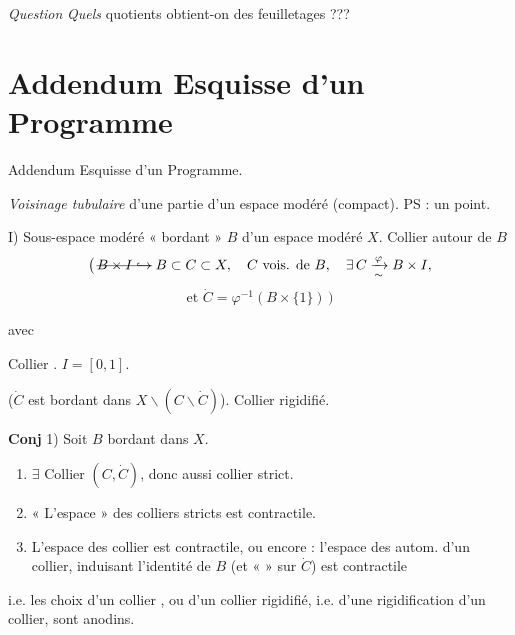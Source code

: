 \documentclass[11pt,a4paper]{article}
\begin{document}
\emph{Question} \emph{Quels} quotients obtient-on  des feuilletages ???



\section{Addendum Esquisse d'un Programme}


Addendum Esquisse d'un Programme.

\emph{Voisinage tubulaire} d'une partie   d'un espace modéré (compact). PS  : un point.

I) Sous-espace modéré « bordant » \struck{\ill{}} $B$ d'un espace modéré $X$. Collier autour de $B$
\[
  \bigl(\, \text{\struck{$B \times I \hookrightarrow$}}\; B \subset C \subset X,
  \quad C \text{ vois. de } B,\quad \exists\, C \xrightarrow[\sim]{\varphi} B \times I,
\]
\[
  \text{et } \dot C = \varphi^{-1}(B \times \{1\}) \,\bigr)
\]

 avec


Collier \struck{\ill{}} . $I = [0, 1]$.

 ($\dot C$ est bordant dans $X \smallsetminus (C \smallsetminus \dot C)$). Collier rigidifié.

\textbf{Conj} 1) Soit $B$ bordant dans $X$.
\begin{enumerate}
  \item[a)] $\exists$ Collier $(C, \dot C)$, donc aussi collier strict.
  \item[b)] « L'espace » des colliers stricts est contractile.
  \item[c)] L'espace des  collier \struck{\ill{}} est contractile, ou encore : l'espace des autom. d'un collier, induisant l'identité de $B$ (et «  » sur $\dot C$) est contractile
\end{enumerate}
i.e. les choix d'un collier , ou d'un collier  rigidifié, i.e. d'une rigidification d'un collier, sont anodins.
\end{document}

